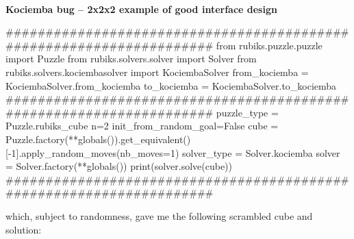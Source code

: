 \afblue
\paragraph{}{\textbf{Kociemba bug -- 2x2x2 example of good interface design}}
\begin{python}
#####################################################################
from rubiks.puzzle.puzzle import Puzzle
from rubiks.solvers.solver import Solver
from rubiks.solvers.kociembasolver import KociembaSolver
from_kociemba = KociembaSolver.from_kociemba
to_kociemba = KociembaSolver.to_kociemba
#####################################################################
puzzle_type = Puzzle.rubiks_cube
n=2
init_from_random_goal=False
cube = Puzzle.factory(**globals()).get_equivalent()[-1].apply_random_moves(nb_moves=1)
solver_type = Solver.kociemba
solver = Solver.factory(**globals())
print(solver.solve(cube))
#####################################################################
\end{python}
\black

which, subject to randomness, gave me the following scrambled cube and solution:


